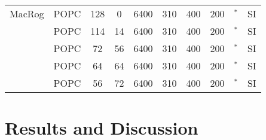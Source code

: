 \documentclass[pre,aps,floatfix,authordate1-4,twocolumn]{revtex4-1}
\begin{document}
\begin{table*}[htb]
\begin{tabular}{c c c c c c c c c c}
MacRog\cite{maciejewski14}     & POPC   & 128 & 0  & 6400   & 310 & 400 & 200 & \cite{macrogCHOLfiles}$^*$ & SI \\ 
                          & POPC   & 114  & 14 & 6400  & 310  & 400 & 200 & \cite{macrogCHOLfiles}$^*$ & SI    \\
                          & POPC   & 72   & 56 & 6400  & 310  & 400 & 200 & \cite{macrogCHOLfiles}$^*$ & SI    \\
                             & POPC   & 64  & 64 & 6400  & 310  & 400 & 200 & \cite{macrogCHOLfiles}$^*$ & SI    \\
                             & POPC   & 56   & 72 & 6400  & 310  & 400 & 200 & \cite{macrogCHOLfiles}$^*$ & SI    \\
\end{tabular}
\end{table*} 








\section{Results and Discussion}
\end{document}
